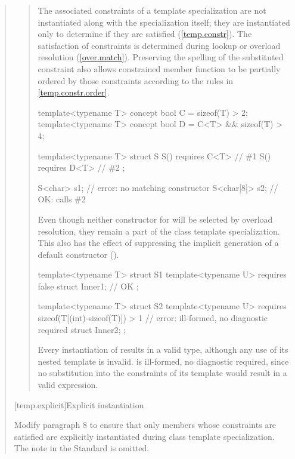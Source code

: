 \begin{quote}
\begin{quote}
\begin{addedblock}
\setcounter{Paras}{15}
\pnum
The associated constraints of a template specialization are not
instantiated along with the specialization itself; they are
instantiated only to determine if they are satisfied
(\ref{temp.constr}).
% 
\enternote
The satisfaction of constraints is determined during lookup or overload
resolution (\ref{over.match}). Preserving the spelling
of the substituted constraint also allows constrained member function
to be partially ordered by those constraints according to the rules
in \ref{temp.constr.order}.
\exitnote
% 
\enterexample
\begin{codeblock}
template<typename T> concept bool C = sizeof(T) > 2;
template<typename T> concept bool D = C<T> && sizeof(T) > 4;

template<typename T> struct S {
  S() requires C<T> { } // \#1
  S() requires D<T> { } // \#2
};

S<char> s1;    // error: no matching constructor
S<char[8]> s2; // OK: calls \#2
\end{codeblock}

Even though neither constructor for  will be selected by
overload resolution, they remain a part of the class template specialization. 
% 
This also has the effect of suppressing the implicit generation of a default
constructor ().
\exitexample

\enterexample
\begin{codeblock}
template<typename T> struct S1 {
  template<typename U> requires false struct Inner1; // OK
};

template<typename T> struct S2 {
  template<typename U> 
    requires sizeof(T[(int)-sizeof(T)]) > 1 // error: ill-formed, no diagnostic required
      struct Inner2;
};
\end{codeblock}
\exitexample
Every instantiation of  results in a valid type, although any use 
of its nested  template is invalid.
% 
 is ill-formed, no diagnostic required, since no substitution into 
the constraints of its  template would result in a valid 
expression.
\end{addedblock}
\end{quote}


[temp.explicit]{Explicit instantiation}

Modify paragraph 8 to ensure that only members whose constraints are 
satisfied are explicitly instantiated during class template 
specialization. The note in the \Cpp Standard is omitted.


\end{quote}
